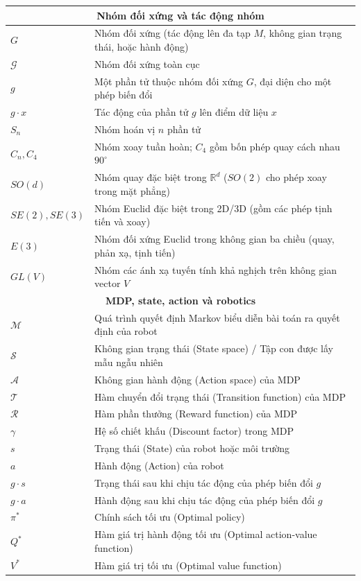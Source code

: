 \documentclass[oneside]{hcmus-report}
\theoremstyle{plain}
\theoremstyle{definition}
\begin{document}
\begin{longtable}{p{} p{}}
\multicolumn{2}{c}{\textbf{Nhóm đối xứng và tác động nhóm}} \\
\hline
$G$ & Nhóm đối xứng (tác động lên đa tạp $M$, không gian trạng thái, hoặc hành động) \\
$\mathcal{G}$ & Nhóm đối xứng toàn cục \\
$g$ & Một phần tử thuộc nhóm đối xứng $G$, đại diện cho một phép biến đổi \\
$g \cdot x$ & Tác động của phần tử $g$ lên điểm dữ liệu $x$ \\
$S_n$ & Nhóm hoán vị $n$ phần tử \\
$C_n, C_4$ & Nhóm xoay tuần hoàn; $C_4$ gồm bốn phép quay cách nhau $90^\circ$ \\
$SO(d)$ & Nhóm quay đặc biệt trong $\mathbb{R}^d$ ($SO(2)$ cho phép xoay trong mặt phẳng) \\
$SE(2), SE(3)$ & Nhóm Euclid đặc biệt trong 2D/3D (gồm các phép tịnh tiến và xoay) \\
$E(3)$ & Nhóm đối xứng Euclid trong không gian ba chiều (quay, phản xạ, tịnh tiến) \\
$GL(V)$ & Nhóm các ánh xạ tuyến tính khả nghịch trên không gian vector $V$ \\

\hline

\multicolumn{2}{c}{\textbf{MDP, state, action và robotics}} \\
\hline
$\mathcal{M}$ & Quá trình quyết định Markov biểu diễn bài toán ra quyết định của robot \\
$\mathcal{S}$ & Không gian trạng thái (State space) / Tập con được lấy mẫu ngẫu nhiên \\
$\mathcal{A}$ & Không gian hành động (Action space) của MDP \\
$\mathcal{T}$ & Hàm chuyển đổi trạng thái (Transition function) của MDP \\
$\mathcal{R}$ & Hàm phần thưởng (Reward function) của MDP \\
$\gamma$ & Hệ số chiết khấu (Discount factor) trong MDP \\
$s$ & Trạng thái (State) của robot hoặc môi trường \\
$a$ & Hành động (Action) của robot \\
$g \cdot s$ & Trạng thái sau khi chịu tác động của phép biến đổi $g$ \\
$g \cdot a$ & Hành động sau khi chịu tác động của phép biến đổi $g$ \\
$\pi^*$ & Chính sách tối ưu (Optimal policy) \\
$Q^*$ & Hàm giá trị hành động tối ưu (Optimal action-value function) \\
$V^*$ & Hàm giá trị tối ưu (Optimal value function) \\


\end{longtable}
\end{document}
